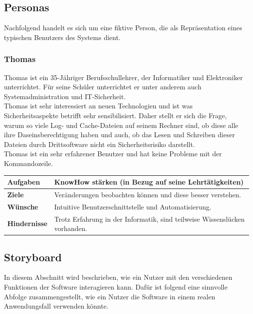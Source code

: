 \documentclass[a4paper,12pt]{report}
\begin{document}
    \subsection{Personas}\label{subsec:persona}
    Nachfolgend handelt es sich um eine fiktive Person, die als Repräsentation eines typischen Benutzers des Systems dient.

    \subsubsection{Thomas}

    Thomas ist ein 35-Jähriger Berufsschullehrer, der Informatiker und Elektroniker unterrichtet.
    Für seine Schüler unterrichtet er unter anderem auch
    Systemadministration und IT-Sicherheit. \\
    Thomas ist sehr interessiert an neuen Technologien und ist was Sicherheitsaspekte betrifft sehr sensibilisiert.
    Daher stellt er sich die Frage, warum so viele Log- und Cache-Dateien auf seinem Rechner sind, ob diese alle
    ihre Daseinsberechtigung haben und auch, ob das Lesen und Schreiben dieser Dateien durch Drittsoftware nicht ein Sicherheitsrisiko
    darstellt. \\
    Thomas ist ein sehr erfahrener Benutzer und hat keine Probleme mit der Kommandozeile.

    \begin{table}[h!]
        \centering
        \setlength{\leftmargini}{0.4cm}
        \begin{tabular}{|p{2.5cm}|p{7cm}|}
            \hline
            \textbf{Aufgaben}    & KnowHow stärken (in Bezug auf seine Lehrtätigkeiten)                       \\
            \hline
            \textbf{Ziele}       & Veränderungen beobachten können und diese besser verstehen.                \\
            \hline
            \textbf{Wünsche}     & Intuitive Benutzerschnittstelle und Automatisierung.                       \\
            \hline
            \textbf{Hindernisse} & Trotz Erfahrung in der Informatik, sind teilweise Wissenslücken vorhanden. \\
            \hline
        \end{tabular}
        \label{tab:table7}
    \end{table}

    \newpage

    \subsection{Storyboard}
    In diesem Abschnitt wird beschrieben, wie ein Nutzer mit den verschiedenen Funktionen der Software
    interagieren kann.
    Dafür ist folgend eine sinnvolle Abfolge zusammengestellt, wie ein Nutzer die Software in einem realen Anwendungsfall verwenden könnte.
\end{document}
